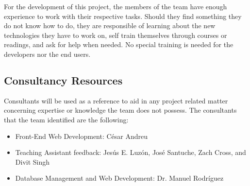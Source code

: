 For the development of this project, the members of the team have enough
experience to work with their respective tasks. Should they find something they
do not know how to do, they are responsible of learning about the new
technologies they have to work on, self train themselves through courses or
readings, and ask for help when needed. No special training is needed for the developers nor the end users.

\subsection{Consultancy Resources}

Consultants will be used as a reference to aid in any project
related matter concerning expertise or knowledge the team does not possess. The consultants that the team identified are the following:

\begin{itemize}
\item Front-End Web Development: César Andreu
\item Teaching Assistant feedback: Jesús E. Luzón, José Santuche, Zach Cross, and Divit Singh
\item Database Management and Web Development: Dr. Manuel Rodríguez
\end{itemize}